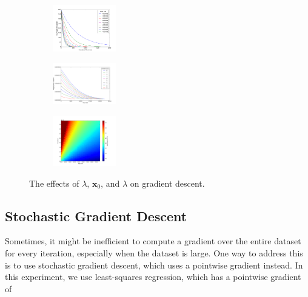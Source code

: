 \documentclass[10pt]{paper}
\begin{document}
\begin{figure}[ht!]
  \centering
  \begin{subfigure}
    \centering
      \includegraphics[width=0.3\textwidth]{../images/quadratic_steps_vs_mag}
  \end{subfigure}
  \begin{subfigure}
    \centering
      \includegraphics[width=0.3\textwidth]{../images/guess_vs_mags_2}
  \end{subfigure}
  \begin{subfigure}
    \centering
      \includegraphics[width=0.3\textwidth]{../images/lsq_error_gradient}
  \end{subfigure}
  \caption{The effects of $\lambda$, $\mathbf{x}_0$, and $\lambda$ on gradient descent.}
\end{figure}

\subsection{Stochastic Gradient Descent}

Sometimes, it might be inefficient to compute a gradient over the entire dataset for every iteration, especially when the dataset is large. One way to address this is to use stochastic gradient descent, which uses a pointwise gradient instead. In this experiment, we use least-squares regression, which has a pointwise gradient of 
\end{document}
